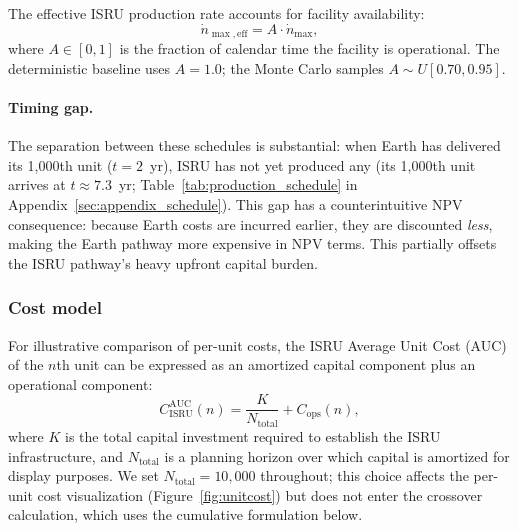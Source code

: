 \documentclass[preprint,12pt]{elsarticle}
\begin{document}
The effective ISRU production rate accounts for facility availability:
\begin{equation}
  \dot{n}_{\max,\mathrm{eff}} = A \cdot \dot{n}_{\max},
  \label{eq:availability}
\end{equation}
where $A \in [0,1]$ is the fraction of calendar time the facility is operational. The deterministic baseline uses $A = 1.0$; the Monte Carlo samples $A \sim U[0.70, 0.95]$.

\paragraph{Timing gap.} The separation between these schedules is substantial: when Earth has delivered its 1{,}000th unit ($t = 2$~yr), ISRU has not yet produced any (its 1{,}000th unit arrives at $t \approx 7.3$~yr; Table~\ref{tab:production_schedule} in Appendix~\ref{sec:appendix_schedule}). This gap has a counterintuitive NPV consequence: because Earth costs are incurred earlier, they are discounted \emph{less}, making the Earth pathway more expensive in NPV terms. This partially offsets the ISRU pathway's heavy upfront capital burden.

\subsubsection{Cost model}

For illustrative comparison of per-unit costs, the ISRU Average Unit Cost (AUC) of the $n$th unit can be expressed as an amortized capital component plus an operational component:
\begin{equation}
  C_{\mathrm{ISRU}}^{\mathrm{AUC}}(n) = \frac{K}{N_{\mathrm{total}}} + C_{\mathrm{ops}}(n),
  \label{eq:isru_unit}
\end{equation}
where $K$ is the total capital investment required to establish the ISRU infrastructure, and $N_{\mathrm{total}}$ is a planning horizon over which capital is amortized for display purposes. We set $N_{\mathrm{total}} = 10{,}000$ throughout; this choice affects the per-unit cost visualization (Figure~\ref{fig:unitcost}) but does not enter the crossover calculation, which uses the cumulative formulation below.
\end{document}
